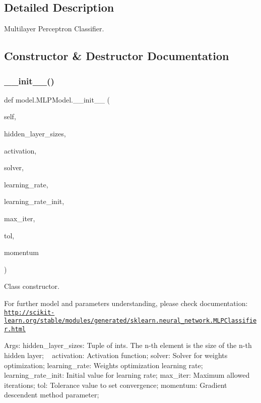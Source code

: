 \subsection{Detailed Description}
Multilayer Perceptron Classifier. 

\subsection{Constructor \& Destructor Documentation}
\mbox{\label{classmodel_1_1_m_l_p_model_af9eb7cda208eabb7ec7c91b7064d3769}} 
\subsubsection{\texorpdfstring{\+\_\+\+\_\+init\+\_\+\+\_\+()}{\_\_init\_\_()}}
{\footnotesize\ttfamily def model.\+M\+L\+P\+Model.\+\_\+\+\_\+init\+\_\+\+\_\+ (\begin{DoxyParamCaption}\item[{}]{self,  }\item[{}]{hidden\+\_\+layer\+\_\+sizes,  }\item[{}]{activation,  }\item[{}]{solver,  }\item[{}]{learning\+\_\+rate,  }\item[{}]{learning\+\_\+rate\+\_\+init,  }\item[{}]{max\+\_\+iter,  }\item[{}]{tol,  }\item[{}]{momentum }\end{DoxyParamCaption})}



Class constructor. 

For further model and parameters understanding, please check documentation\+: \href{http://scikit-learn.org/stable/modules/generated/sklearn.neural_network.MLPClassifier.html}{\tt http\+://scikit-\/learn.\+org/stable/modules/generated/sklearn.\+neural\+\_\+network.\+M\+L\+P\+Classifier.\+html}

Args\+: hidden\+\_\+layer\+\_\+sizes\+: Tuple of ints. The n-\/th element is the size of the n-\/th hidden layer; ~\newline
 activation\+: Activation function; solver\+: Solver for weights optimization; learning\+\_\+rate\+: Weights optimization learning rate; learning\+\_\+rate\+\_\+init\+: Initial value for learning rate; max\+\_\+iter\+: Maximum allowed iterations; tol\+: Tolerance value to set convergence; momentum\+: Gradient descendent method parameter; 

